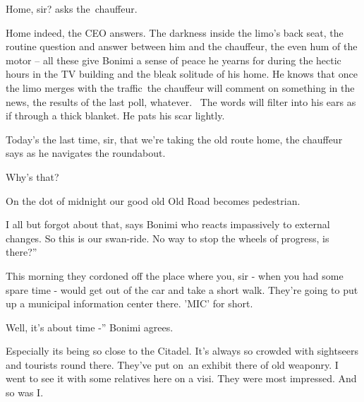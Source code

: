 \documentclass[letterpaper]{article}
\begin{document}
{\textquotedbl}Home, sir?{\textquotedbl} asks the~chauffeur. 

{\textquotedbl}Home indeed,{\textquotedbl} the CEO answers. The darkness inside{ }the limo's back seat,
the routine question and answer between him and the chauffeur, the even hum of the motor -- all these give Bonimi a
sense of peace he yearns for during the hectic hours in the TV building and the{ }bleak solitude of his
home. He knows that once the limo merges with the traffic~the chauffeur will comment on something in the news, the
results of the last poll, whatever. \ The words will filter into his ears as if through a thick blanket. He pats his
scar lightly.

{\textquotedbl}Today's the last time, sir, that we're taking the old route home,{\textquotedbl} the chauffeur says as he
navigates the roundabout. 

{\textquotedbl}Why's that?{\textquotedbl} 

{\textquotedbl}On the dot of midnight our good old Old Road becomes pedestrian.{\textquotedbl} 

{\textquotedbl}I all but forgot about that,{\textquotedbl} says Bonimi who reacts impassively to external changes.
{\textquotedbl}So this is our swan-ride. No way to stop the wheels of progress, is there?'' 

{\textquotedbl}This morning they cordoned off the place where you, sir - when you had some spare time - would get out of
the car and take a short walk. They're going to put up a municipal information center there. 'MIC' for
short.{\textquotedbl} 

{\textquotedbl}Well, it's about time -'' Bonimi agrees. {\ }

{\textquotedbl}Especially its being so close to the Citadel. It's always so crowded with sightseers and tourists round
there. They've put on~an exhibit there of old weaponry. I went to see it with some relatives here on a visi. They were
most impressed. And so was I.{\textquotedbl}
\end{document}
